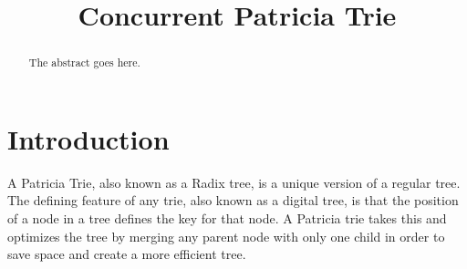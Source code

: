 \documentclass[conference]{IEEEtran}
\begin{document}
\title{Concurrent Patricia Trie}

\author{
\and
{}
}

\maketitle


\begin{abstract}
The abstract goes here.
\end{abstract}


\section{Introduction}
A Patricia Trie, also known as a Radix tree, is a unique version of a regular tree. The defining feature of any trie, also known
as a digital tree, is that the position of a node in a tree defines the key for that node. A Patricia trie takes this and optimizes the tree by 
merging any parent node with only one child in order to save space and create a more efficient tree.\cite{Shafiei2013} \par
\end{document}
